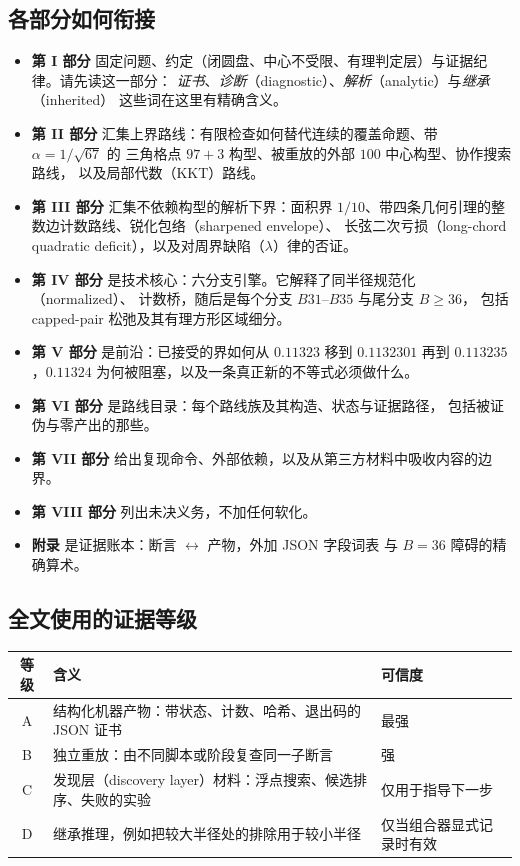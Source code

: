 \subsection*{各部分如何衔接}

\begin{itemize}[leftmargin=1.4em,itemsep=2pt]
\item \textbf{第 I 部分} 固定问题、约定（闭圆盘、中心不受限、有理判定层）与证据纪律。请先读这一部分：
\emph{证书}、\emph{诊断}（diagnostic）、\emph{解析}（analytic）与\emph{继承}（inherited）
这些词在这里有精确含义。
\item \textbf{第 II 部分} 汇集上界路线：有限检查如何替代连续的覆盖命题、带 $\alpha=1/\sqrt{67}$ 的
三角格点 $97{+}3$ 构型、被重放的外部 $100$ 中心构型、协作搜索路线，
以及局部代数（KKT）路线。
\item \textbf{第 III 部分} 汇集不依赖构型的解析下界：面积界
$1/10$、带四条几何引理的整数边计数路线、锐化包络（sharpened envelope）、
长弦二次亏损（long-chord quadratic deficit），以及对周界缺陷（$\lambda$）律的否证。
\item \textbf{第 IV 部分} 是技术核心：六分支引擎。它解释了同半径规范化（normalized）、
计数桥，随后是每个分支 $B31$--$B35$ 与尾分支 $B\ge36$，
包括 capped-pair 松弛及其有理方形区域细分。
\item \textbf{第 V 部分} 是前沿：已接受的界如何从 $0.11323$ 移到 $0.1132301$
再到 $0.113235$，$0.11324$ 为何被阻塞，以及一条真正新的不等式必须做什么。
\item \textbf{第 VI 部分} 是路线目录：每个路线族及其构造、状态与证据路径，
包括被证伪与零产出的那些。
\item \textbf{第 VII 部分} 给出复现命令、外部依赖，以及从第三方材料中吸收内容的边界。
\item \textbf{第 VIII 部分} 列出未决义务，不加任何软化。
\item \textbf{附录} 是证据账本：断言 $\leftrightarrow$ 产物，外加 JSON 字段词表
与 $B=36$ 障碍的精确算术。
\end{itemize}

\subsection*{全文使用的证据等级}

\begin{center}
\footnotesize
\begin{tabular}{@{}c>{\raggedright\arraybackslash}p{}>{\raggedright\arraybackslash}p{}@{}}
\toprule
等级 & 含义 & 可信度 \\
\midrule
A & 结构化机器产物：带状态、计数、哈希、退出码的 JSON 证书 & 最强 \\
B & 独立重放：由不同脚本或阶段复查同一子断言 & 强 \\
C & 发现层（discovery layer）材料：浮点搜索、候选排序、失败的实验 & 仅用于指导下一步 \\
D & 继承推理，例如把较大半径处的排除用于较小半径 & 仅当组合器显式记录时有效 \\
\bottomrule
\end{tabular}
\end{center}

